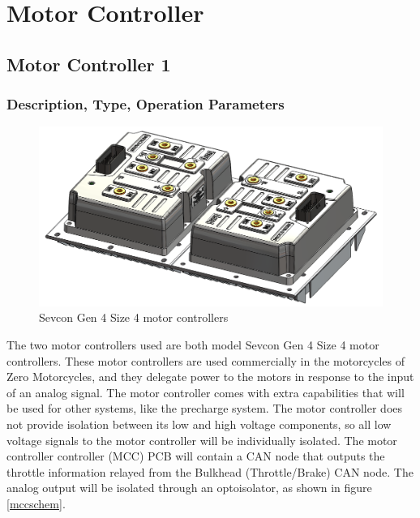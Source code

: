 \documentclass{article}
\begin{document}
\newpage

\section{Motor Controller} \label{MCs}

    \subsection{Motor Controller 1} \label{MC1}

        \subsubsection{Description, Type, Operation Parameters}


            \begin{figure}[H]
                \centering
                \includegraphics[width = 0.7 \textwidth]{motorcontrollers_separate}
                \caption{Sevcon Gen 4 Size 4 motor controllers}
                \label{mcoffcar}
            \end{figure}

            The two motor controllers used are both model Sevcon Gen 4 Size 4 motor controllers. These motor controllers are used commercially in the motorcycles of Zero Motorcycles, and they delegate power to the motors in response to the input of an analog signal. The motor controller comes with extra capabilities that will be used for other systems, like the precharge system. The motor controller does not provide isolation between its low and high voltage components, so all low voltage signals to the motor controller will be individually isolated. The motor controller controller (MCC) PCB will contain a CAN node that outputs the throttle information relayed from the Bulkhead (Throttle/Brake) CAN node. The analog output will be isolated through an optoisolator, as shown in figure \ref{mccschem}.
\end{document}
